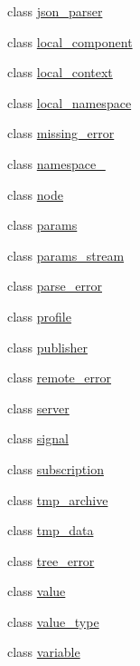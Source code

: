 \begin{DoxyCompactItemize}
\item 
class \hyperlink{classtelegraph_1_1json__parser}{json\+\_\+parser}
\item 
class \hyperlink{classtelegraph_1_1local__component}{local\+\_\+component}
\item 
class \hyperlink{classtelegraph_1_1local__context}{local\+\_\+context}
\item 
class \hyperlink{classtelegraph_1_1local__namespace}{local\+\_\+namespace}
\item 
class \hyperlink{classtelegraph_1_1missing__error}{missing\+\_\+error}
\item 
class \hyperlink{classtelegraph_1_1namespace__}{namespace\+\_\+}
\item 
class \hyperlink{classtelegraph_1_1node}{node}
\item 
class \hyperlink{classtelegraph_1_1params}{params}
\item 
class \hyperlink{classtelegraph_1_1params__stream}{params\+\_\+stream}
\item 
class \hyperlink{classtelegraph_1_1parse__error}{parse\+\_\+error}
\item 
class \hyperlink{classtelegraph_1_1profile}{profile}
\item 
class \hyperlink{classtelegraph_1_1publisher}{publisher}
\item 
class \hyperlink{classtelegraph_1_1remote__error}{remote\+\_\+error}
\item 
class \hyperlink{classtelegraph_1_1server}{server}
\item 
class \hyperlink{classtelegraph_1_1signal}{signal}
\item 
class \hyperlink{classtelegraph_1_1subscription}{subscription}
\item 
class \hyperlink{classtelegraph_1_1tmp__archive}{tmp\+\_\+archive}
\item 
class \hyperlink{classtelegraph_1_1tmp__data}{tmp\+\_\+data}
\item 
class \hyperlink{classtelegraph_1_1tree__error}{tree\+\_\+error}
\item 
class \hyperlink{classtelegraph_1_1value}{value}
\item 
class \hyperlink{classtelegraph_1_1value__type}{value\+\_\+type}
\item 
class \hyperlink{classtelegraph_1_1variable}{variable}
\end{DoxyCompactItemize}
